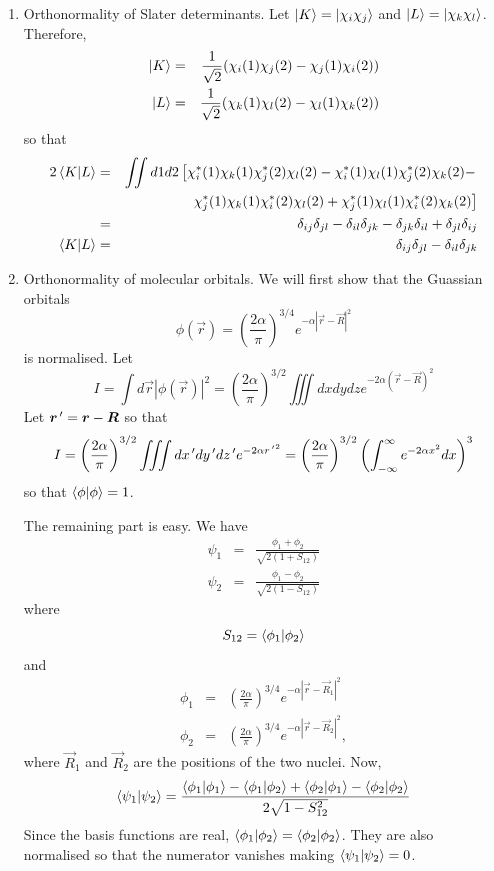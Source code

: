 \begin{enumerate}
\item\label{c2p5} Orthonormality of Slater determinants.
Let $\ket{K} = \ket{\chi_i\chi_j}$ and $\ket{L} = \ket{\chi_k\chi_l}$. Therefore,
\begin{eqnarray*}
\ket{K} &=&\frac{1}{\sqrt{2}}(\chi_i(1)\chi_j(2) - \chi_j(1)\chi_i(2)) \\
\ket{L} &=&\frac{1}{\sqrt{2}}(\chi_k(1)\chi_l(2) - \chi_l(1)\chi_k(2)) 
\end{eqnarray*}
so that
\begin{eqnarray*}
2\braket{K|L} &=& \iint d1d2\left[\chi_i^\ast(1)\chi_k(1)\chi_j^\ast(2)\chi_l(2) - 
 \chi_i^\ast(1)\chi_l(1)\chi_j^\ast(2)\chi_k(2) - \right. \\
 & & \left. \chi_j^\ast(1)\chi_k(1)\chi_i^\ast(2)\chi_l(2) + 
 \chi_j^\ast(1)\chi_l(1)\chi_i^\ast(2)\chi_k(2)\right] \\
 &=& \delta_{ij}\delta_{jl} - \delta_{il}\delta_{jk} - \delta_{jk}\delta_{il}
 + \delta_{jl}\delta_{ij} \\
\braket{K|L} &=& \delta_{ij}\delta_{jl} - \delta_{il}\delta_{jk}
\end{eqnarray*}

\item\label{c2p6} Orthonormality of molecular orbitals.
We will first show that the Guassian orbitals
\[
\phi(\vec{r}) = 
\left(\frac{2\alpha}{\pi}\right)^{3/4}e^{-\alpha|\vec{r}-\vec{R}|^2}
\]
is normalised.
Let
\[
I = \int d\vec{r} |\phi(\vec{r})|^2 = \left(\frac{2\alpha}{\pi}\right)^{3/2}
\iiint dxdydz e^{-2\alpha (\vec{r} - \vec{R})^2}
\]
Let $\bm{r}^{\,\prime} = \bm{r} - \bm{R}$ so that
\[
I = \left(\frac{2\alpha}{\pi}\right)^{3/2}
\iiint dx^{\,\prime} dy^{\,\prime} dz^{\,\prime} e^{-2\alpha {r^{\,\prime}}^2}
= \left(\frac{2\alpha}{\pi}\right)^{3/2}
\left(\int_{-\infty}^\infty e^{-2\alpha x^2}dx\right)^3
\]
so that $\braket{\phi|\phi} = 1$.

The remaining part is easy. We have
\begin{eqnarray*}
\psi_1 &=& \frac{\phi_1 + \phi_2}{\sqrt{2(1 + S_{12})}} \\
\psi_2 &=& \frac{\phi_1 - \phi_2}{\sqrt{2(1 - S_{12})}} 
\end{eqnarray*}
where 
\[
S_{12} = \braket{\phi_1|\phi_2}
\]
and
\begin{eqnarray*}
\phi_1&=&\left(\frac{2\alpha}{\pi}\right)^{3/4}e^{-\alpha|\vec{r}-\vec{R}_1|^2} \\
\phi_2&=&\left(\frac{2\alpha}{\pi}\right)^{3/4}e^{-\alpha|\vec{r}-\vec{R}_2|^2},
\end{eqnarray*}
where $\vec{R}_1$ and $\vec{R}_2$ are the positions of the two nuclei.
Now,
\[
\braket{\psi_1|\psi_2} = \frac{\braket{\phi_1|\phi_1} - \braket{\phi_1|\phi_2}
+ \braket{\phi_2|\phi_1} - \braket{\phi_2|\phi_2}}{2\sqrt{1 - S_{12}^2}}
\]
Since the basis functions are real, $\braket{\phi_1|\phi_2} = \braket{\phi_2|
\phi_2}$. They are also normalised so that the numerator vanishes making
$\braket{\psi_1|\psi_2} = 0$.


\end{enumerate}
